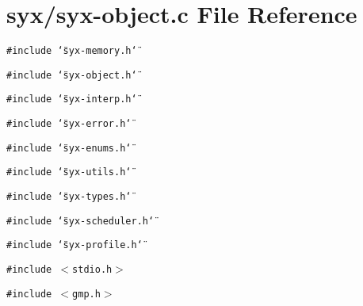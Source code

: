 \hypertarget{syx-object_8c}{
\section{syx/syx-object.c File Reference}
\label{syx-object_8c}
}
{\tt \#include \char`\"{}syx-memory.h\char`\"{}}\par
{\tt \#include \char`\"{}syx-object.h\char`\"{}}\par
{\tt \#include \char`\"{}syx-interp.h\char`\"{}}\par
{\tt \#include \char`\"{}syx-error.h\char`\"{}}\par
{\tt \#include \char`\"{}syx-enums.h\char`\"{}}\par
{\tt \#include \char`\"{}syx-utils.h\char`\"{}}\par
{\tt \#include \char`\"{}syx-types.h\char`\"{}}\par
{\tt \#include \char`\"{}syx-scheduler.h\char`\"{}}\par
{\tt \#include \char`\"{}syx-profile.h\char`\"{}}\par
{\tt \#include $<$stdio.h$>$}\par
{\tt \#include $<$gmp.h$>$}\par
